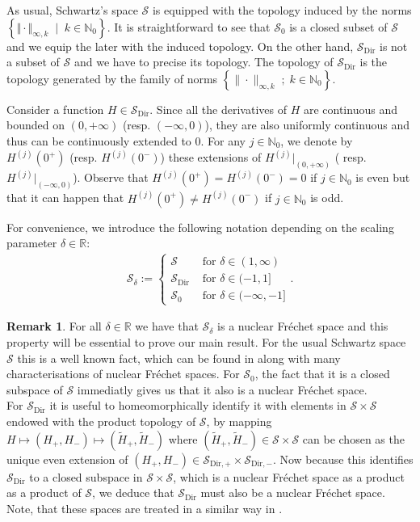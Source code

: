 \documentclass[a4paper, reqno, 12pt]{amsart}
\theoremstyle{plain}
\theoremstyle{definition}
\newtheorem{remark}[definition]{Remark}
\newcommand{\R}{\mathbb{R}}
\newcommand{\Sdir}{\mathcal{S}_{\text{Dir}}}
\begin{document}
As usual, Schwartz's space $\mathcal S $ is equipped with the topology induced by the norms $\left\{ \Vert \cdot \Vert_{\infty, k} \;  \mid \;  k\in \mathbb N_0 \right\}$. It is straightforward to see that $\mathcal S_0 $ is a closed subset of $\mathcal S $ and we equip the later with the induced topology. On the other hand, $\Sdir $ is not a subset of $\mathcal S $ and we have to precise its topology. The topology of $\Sdir $ is the topology generated by the family of norms $\left\{\|\cdot\|_{\infty,k}  \; ; \; k \in \mathbb N_0 \right\}$.


\bigskip

Consider a function $H\in\Sdir $. Since all the derivatives of $H$ are continuous and bounded on $(0,+\infty)$ (resp. $(-\infty, 0)$), they are also uniformly continuous and thus can be continuously extended to $0$. For any $j \in \mathbb N_0$, we denote by $H^{(j)}(0^+)$ (resp. $H^{(j)}(0^-)$) these extensions of $H^{(j)}\vert_{(0,+\infty)}$ ( resp. $H^{(j)}\vert_{(-\infty,0)}$). Observe that $ H^{(j)}(0^+)=H^{(j)}(0^-) = 0$ if $j \in \mathbb N_0$ is even but that it can happen  that $ H^{(j)}(0^+)\ne H^{(j)}(0^-)$ if $j \in \mathbb N_0$ is odd. 



For convenience, we introduce the  following notation depending on the scaling parameter $\delta\in\R$:
\begin{align*}
    \mathcal S_{\delta}:=\left\{ \begin{array}{ll}
       \mathcal S  & \text{ for } \delta\in (1,\infty) \\
        \Sdir   & \text{ for } \delta\in (-1,1] \\
        \mathcal S_0   & \text{ for } \delta\in (-\infty,-1]
    \end{array}
    \right..
\end{align*}

\begin{remark} 
\label{rem:nuclear}
For all $\delta\in\R$ we have that $\mathcal S_{\delta}$ is a nuclear Fréchet space and this property will be essential to prove our main result.
For the usual Schwartz space $\mathcal S$ this is a well known fact, which can be found in \cite[Chapter 3, Section 7]{S71} along with many characterisations of nuclear Fréchet spaces.
For $\mathcal{S}_0$, the fact that it is a closed subspace of $\mathcal S$ immediatly gives us that it also is a nuclear Fréchet space.\\
For $\Sdir$ it is useful to homeomorphically identify it with elements in $\mathcal S\times\mathcal S$ endowed with the product topology of $\mathcal S$, by mapping $ H\mapsto (H_+,H_-) \mapsto (\tilde H_+, \tilde H_-)$ where $(\tilde H_+, \tilde H_-)\in\mathcal S\times\mathcal S$ can be chosen as the unique even extension of $(H_+,H_-)\in\mathcal S_{\text{Dir},+}\times\mathcal S_{\text{Dir},-}$. Now because this identifies $\Sdir$ to a closed subspace in $\mathcal S\times\mathcal S$, which is a nuclear Fréchet space as a product as a product of $\mathcal S$, we deduce that $\Sdir$ must also be a nuclear Fréchet space.
Note, that these spaces are treated in a similar way in \cite{CGJ23}.
\end{remark}
\end{document}
